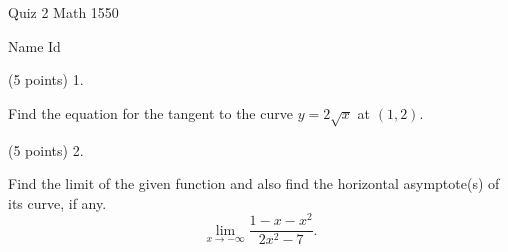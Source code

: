 \documentclass{article}
\begin{document}
\begin{large}
\begin{bf}
\hspace{1.5in}
\parbox{1in}{Quiz 2 \newline Math 1550}
\hspace{1in}
\parbox{1in}{ Name \newline Id}
\end{bf}
\end{large}

 

\vspace{0.3in}
   
(5 points) 1. \parbox[t]{4in}{ Find the equation for the tangent to the 
curve $y=2\sqrt{x}$ at $(1,2)$.} 
  

\vspace{4.47in}

(5 points) 2. \parbox[t]{4in}{Find the limit of the given function and
also find the horizontal asymptote(s) of its curve, if any.
$$\lim_{x\rightarrow -\infty}
\frac{1-x-x^2}{2x^2-7}.$$  } 
  
\end{document}
